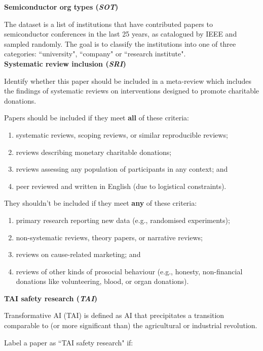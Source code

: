 \documentclass{article}
\begin{document}
\textbf{Semiconductor org types (\textit{SOT})} 

The dataset is a list of institutions that have contributed papers to semiconductor conferences in the last 25 years, as catalogued by IEEE and sampled randomly. The goal is to classify the institutions into one of three categories: ``university", ``company" or ``research institute". \\

\textbf{Systematic review inclusion (\textit{SRI})} 

Identify whether this paper should be included in a meta-review which includes the findings of systematic reviews on interventions designed to promote charitable donations.

Papers should be included if they meet \textbf{all} of these criteria:
\begin{enumerate}
    \item systematic reviews, scoping reviews, or similar reproducible reviews;
    \item reviews describing monetary charitable donations;
    \item reviews assessing any population of participants in any context; and
    \item peer reviewed and written in English (due to logistical constraints).
\end{enumerate}

They shouldn’t be included if they meet \textbf{any} of these criteria:
\begin{enumerate}
    \item primary research reporting new data (e.g., randomised experiments);
    \item non-systematic reviews, theory papers, or narrative reviews;
    \item reviews on cause-related marketing; and
    \item reviews of other kinds of prosocial behaviour (e.g., honesty, non-financial donations like volunteering, blood, or organ donations).
\end{enumerate}

\textbf{TAI safety research (\textit{TAI})}

Transformative AI (TAI) is defined as AI that precipitates a transition comparable to (or more significant than) the agricultural or industrial revolution.

Label a paper as ``TAI safety research" if:
\end{document}
